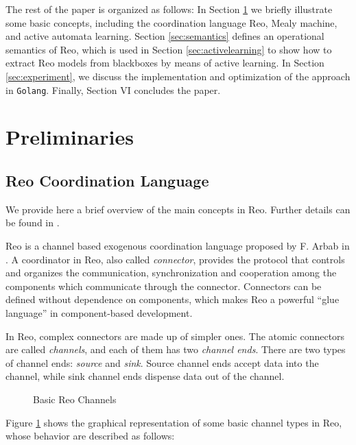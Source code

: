 \documentclass[conference, a4paper]{IEEEtran}
\begin{document}
The rest of the paper is organized as follows: In Section
\ref{sec:preliminaries} we briefly illustrate some basic concepts, including the coordination
language Reo, Mealy machine, and active automata learning. Section \ref{sec:semantics} defines an
operational semantics of Reo, which is used in Section \ref{sec:activelearning} to show how to
extract Reo models from blackboxes by means of active learning. In Section
\ref{sec:experiment}, we discuss the implementation and optimization of the approach in
\texttt{Golang}. Finally, Section VI concludes the paper.

\section{Preliminaries} 
\label{sec:preliminaries}
\subsection{Reo Coordination Language} 
\label{sec:reo}
We provide here a brief overview of the main concepts in Reo. Further details can be found in
\cite{DBLP:journals/mscs/Arbab04, DBLP:journals/scp/BaierSAR06}.

Reo is a channel based exogenous coordination language proposed by F. Arbab in
\cite{DBLP:journals/mscs/Arbab04}. 
A coordinator in Reo, also called \emph{connector}, provides the protocol that controls and
organizes the communication, synchronization and cooperation among the components which
communicate through the connector. Connectors can be defined without dependence on components,
which makes Reo a powerful ``glue language'' in component-based
development\cite{DBLP:journals/sigsoft/Gill03}.

In Reo, complex connectors are made up of simpler ones. The atomic connectors are called
\emph{channels}, and each of them has two \emph{channel ends}. There are two types of channel ends:
\emph{source} and \emph{sink}. Source channel ends accept data into the channel, while sink
channel ends dispense data out of the channel. 

\begin{figure}[ht]
  \begin{center}
    
  \end{center}
  \caption{Basic Reo Channels}
  \label{fig:basic}
\end{figure}

Figure \ref{fig:basic} shows the graphical representation of some basic channel types in Reo, whose
behavior are described as follows:
\end{document}
